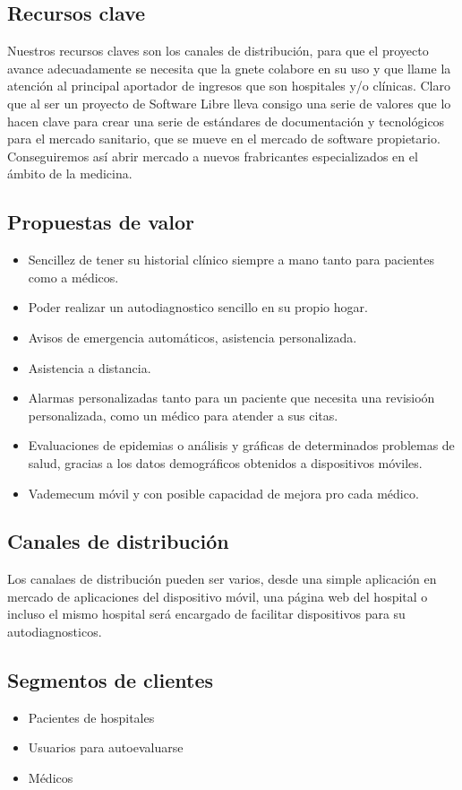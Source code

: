 \documentclass[11pt]{article}
\begin{document}
\subsection{Recursos clave}
Nuestros recursos claves son los canales de distribución, para que el proyecto avance adecuadamente se necesita que la gnete colabore en su uso y que llame la atención al principal aportador de ingresos que son hospitales y/o clínicas.
Claro que al ser un proyecto de Software Libre lleva consigo una serie de valores que lo hacen clave para crear una serie de estándares de documentación y tecnológicos para el mercado sanitario, que se mueve en el mercado de software propietario. Conseguiremos así abrir mercado a nuevos frabricantes especializados en el ámbito de la medicina.

\subsection{Propuestas de valor}
\begin{itemize}
\item Sencillez de tener su historial clínico siempre a mano tanto para pacientes como a médicos.
\item Poder realizar un autodiagnostico sencillo en su propio hogar.
\item Avisos de emergencia automáticos, asistencia personalizada.
\item Asistencia a distancia.
\item Alarmas personalizadas tanto para un paciente que necesita una revisioón personalizada, como un médico para atender a sus citas.
\item Evaluaciones de epidemias o análisis y gráficas de determinados problemas de salud, gracias a los datos demográficos obtenidos a dispositivos móviles.
\item Vademecum móvil y con posible capacidad de mejora pro cada médico.
\end{itemize}

\subsection{Canales de distribución}
Los canalaes de distribución pueden ser varios, desde una simple aplicación en mercado de aplicaciones del dispositivo móvil, una página web del hospital o incluso el mismo hospital será encargado de facilitar dispositivos para su autodiagnosticos.

\subsection{Segmentos de clientes}
\begin{itemize}
\item Pacientes de hospitales
\item Usuarios para autoevaluarse
\item Médicos
\end{itemize}
\end{document}
